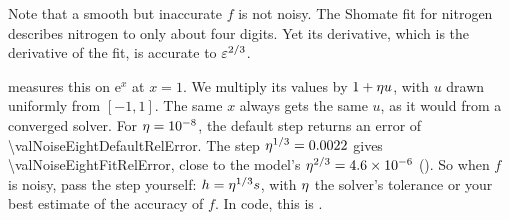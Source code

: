 Note that a smooth but inaccurate $f$ is not noisy. The Shomate fit for nitrogen describes nitrogen to only about
four digits. Yet its derivative, which is the derivative of the fit, is accurate to $\varepsilon^{2/3}$.

\begin{marginfigure}
\centering

\caption{The V of  on $\mathrm{e}^x$ at 1, with the values perturbed by a relative noise
$\noise = 10^{-10}$ and $10^{-8}$, and the clean curve for comparison. The rounding branch lifts to
$\noise \abs{f} / h$, and the minimum moves right and up. The dot marks the step $\noise^{1/3}$ for
$\noise = 10^{-8}$.\label{fig:noise}}
\end{marginfigure}

 measures this on $\mathrm{e}^x$ at $x = 1$. We multiply its values by $1 + \eta u$, with $u$
drawn uniformly from $[-1, 1]$. The same $x$ always gets the same $u$, as it would from a converged solver. For
$\noise = 10^{-8}$, the default step returns an error of \num{\valNoiseEightDefaultRelError}. The step
$\eta^{1/3} = \num{0.0022}$ gives \num{\valNoiseEightFitRelError}, close to the model's
$\eta^{2/3} = \num{4.6e-6}$ (). So when $f$ is noisy,
pass the step yourself: $h = \eta^{1/3} s$, with $\eta$ the solver's tolerance or your best estimate of the
accuracy of $f$. In code, this is .

